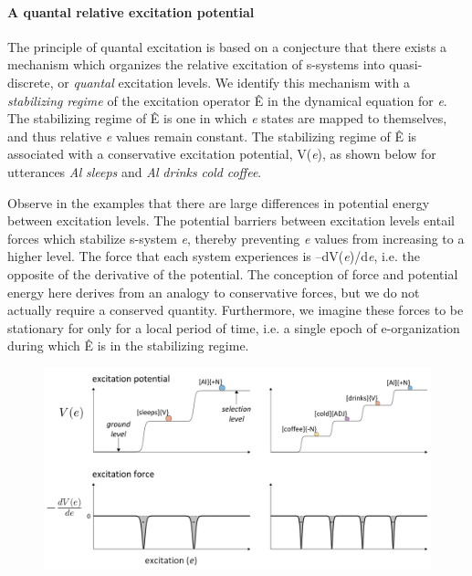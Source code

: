 \paragraph{A quantal relative excitation potential}

The principle of quantal excitation is based on a conjecture that there exists a mechanism which organizes the relative excitation of s-systems into quasi-discrete, or \textit{quantal} excitation levels. We identify this mechanism with a \textit{stabilizing} \textit{regime} of the excitation operator Ê in the dynamical equation for \textit{e}. The stabilizing regime of Ê is one in which \textit{e} states are mapped to themselves, and thus relative \textit{e} values remain constant. The stabilizing regime of Ê is associated with a conservative excitation potential, V(\textit{e}), as shown below for utterances \textit{Al} \textit{sleeps} and \textit{Al} \textit{drinks} \textit{cold} \textit{coffee}. 

  Observe in the examples that there are large differences in potential energy between excitation levels. The potential barriers between excitation levels entail forces which stabilize s-system \textit{e}, thereby preventing \textit{e} values from increasing to a higher level. The force that each system experiences is –dV(\textit{e})/d\textit{e}, i.e. the opposite of the derivative of the potential. The conception of force and potential energy here derives from an analogy to conservative forces, but we do not actually require a conserved quantity. Furthermore, we imagine these forces to be stationary for only for a local period of time, i.e. a single epoch of e-organization during which Ê is in the stabilizing regime. 

  
\begin{figure}
\includegraphics[width=\textwidth]{figures/Tilsen-img23.png}
\caption{\missingcaption}
\label{fig:}
\end{figure}
 

